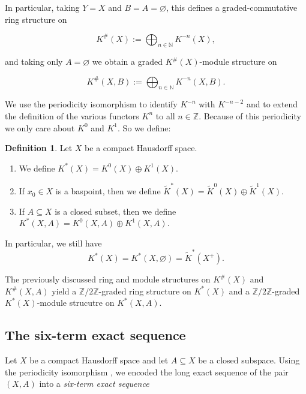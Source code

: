 \documentclass[12pt,a4paper]{amsart}
\theoremstyle{plain}
\theoremstyle{definition}
\newtheorem{defn}[thm]{Definition}
\theoremstyle{remark}
\begin{document}
In particular, taking $Y = X$ and $B = A = \varnothing$, this defines a graded-commutative ring structure on

\[ K^{\#}(X) := \bigoplus_{n \in \mathbb{N}} K^{-n}(X), \]

and taking only $A = \varnothing$ we obtain a graded $K^{\#}(X)$-module structure on

\[ K^{\#}(X,B) := \bigoplus_{n \in \mathbb{N}} K^{-n}(X,B). \]

We use the periodicity isomorphism \cite[Theorem 2.4.9]{ati67} to identify $K^{-n}$ with $K^{-n-2}$ and to extend the definition of the various functors $K^{n}$ to all $n \in \mathbb{Z}$.
Because of this periodicity we only care about $K^{0}$ and $K^{1}$.
So we define:

\begin{defn}
  Let $X$ be a compact Hausdorff space.
  \begin{enumerate}
    \item We define $K^{*}(X) = K^{0}(X) \oplus K^{1}(X)$.
    \item If $x_{0} \in X$ is a baspoint, then we define $\tilde{K}^{*}(X) = \tilde{K}^{0}(X) \oplus \tilde{K}^{1}(X)$.
    \item If $A \subseteq X$ is a closed subset, then we define $K^{*}(X,A) = K^{0}(X,A) \oplus K^{1}(X,A)$.
  \end{enumerate}
  In particular, we still have
  \[ K^{*}(X) = K^{*}(X, \varnothing) = \tilde{K}^{*}(X^{+}). \]
\end{defn}

The previously discussed ring and module structures on $K^{\#}(X)$ and $K^{\#}(X,A)$ yield a $\mathbb{Z}/2\mathbb{Z}$-graded ring structure on $K^{*}(X)$ and a $\mathbb{Z}/2\mathbb{Z}$-graded $K^{*}(X)$-module strucutre on $K^{*}(X,A)$.

\subsection{The six-term exact sequence}

Let $X$ be a compact Hausdorff space and let $A \subseteq X$ be a closed subspace.
Using the periodicity isomorphism \cite[Theorem 2.4.9]{ati67}, we encoded the long exact sequence of the pair $(X,A)$ into a \textit{six-term exact sequence}

\begin{center}
\end{center}
\end{document}
